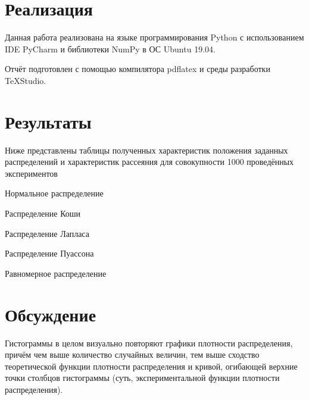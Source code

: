 \section{Реализация}
Данная работа реализована на языке программирования Python с использованием IDE PyCharm и библиотеки NumPy в ОС Ubuntu 19.04.

Отчёт подготовлен с помощью компилятора pdflatex и среды разработки TeXStudio.

\section{Результаты}
Ниже представлены таблицы полученных характеристик положения заданных распределений и характеристик рассеяния для совокупности 1000 проведённых экспериментов

\begin{table}[H]
	\begin{center}
		
		\caption{Нормальное распределение}
		\label{tabl:tabl_name}
	\end{center}
\end{table}

\begin{table}[H]
	\begin{center}
		
		\caption{Распределение Коши}
		\label{tabl:tabl_name}
	\end{center}
\end{table}

\begin{table}[H]
	\begin{center}
		
		\caption{Распределение Лапласа}
		\label{tabl:tabl_name}
	\end{center}
\end{table}

\begin{table}[H]
	\begin{center}
		
		\caption{Распределение Пуассона}
		\label{tabl:tabl_name}
	\end{center}
\end{table}

\begin{table}[H]
	\begin{center}
		
		\caption{Равномерное распределение}
		\label{tabl:tabl_name}
	\end{center}
\end{table}


\section{Обсуждение}
Гистограммы в целом визуально повторяют графики плотности распределения, причём чем выше количество случайных величин, тем выше сходство теоретической функции плотности распределения и кривой, огибающей верхние точки столбцов гистограммы (суть, экспериментальной функции плотности распределения).

